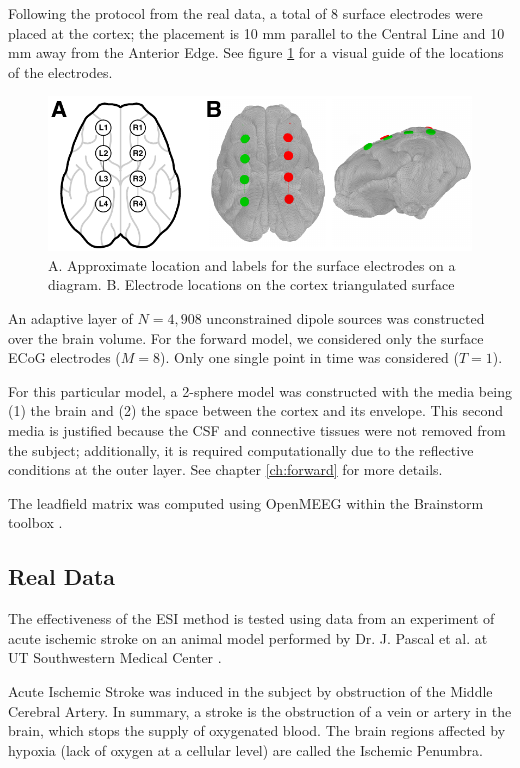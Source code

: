 Following the protocol from the real data, a total of 8 surface electrodes were placed at the cortex; the placement is 10 mm parallel to the Central Line and 10 mm away from the Anterior Edge.
%
See figure \ref{fig:pig_elecs} for a visual guide of the locations of the electrodes.

\begin{figure}
\centering
\includegraphics{./img/electrodes_pig.pdf}
\caption{A. Approximate location and labels for the surface electrodes on a diagram. B. Electrode locations on the cortex triangulated surface}
\label{fig:pig_elecs}
\end{figure}

An adaptive layer of $N=4,908$ unconstrained dipole sources was constructed over the brain volume.
%
For the forward model, we considered only the surface ECoG electrodes ($M=8$).
%
Only one single point in time was considered ($T=1$).

For this particular model, a 2-sphere model was constructed with the media being (1) the brain and (2) the space between the cortex and its envelope.
%
This second media is justified because the CSF and connective tissues were not removed from the subject; additionally, it is required computationally due to the reflective conditions at the outer layer.
%
See chapter \ref{ch:forward} for more details.

The leadfield matrix was computed using OpenMEEG \cite{gramfort2010openmeeg} within the Brainstorm toolbox \cite{brainstorm}.

\subsection{Real Data}
\label{sec:real_data}

The effectiveness of the ESI method is tested using data from an experiment of acute ischemic stroke on an animal model performed by Dr. J. Pascal et al. at UT Southwestern Medical Center \cite{pig_lesion1, PMID_36109613}.

Acute Ischemic Stroke was induced in the subject by obstruction of the Middle Cerebral Artery.
%
In summary, a stroke is the obstruction of a vein or artery in the brain, which stops the supply of oxygenated blood.
%
The brain regions affected by hypoxia (lack of oxygen at a cellular level) are called the Ischemic Penumbra.

